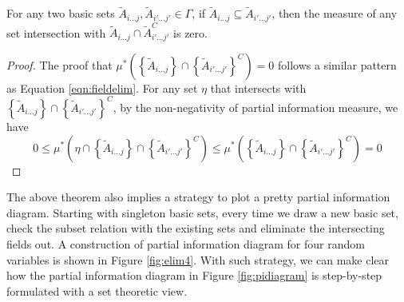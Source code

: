 \begin{theorem} For any two basic sets $\tilde{A}_{i\ldots j} , \tilde{A}_{i' \ldots j'} \in \Gamma$, if $\tilde{A}_{i\ldots j} \subseteq \tilde{A}_{i' \ldots j'}$, then the measure of any set intersection with $\tilde{A}_{i\ldots j} \cap \tilde{A}_{i' \ldots j'}^{C}$ is zero.
\begin{proof}
 The proof that $\mu^{*}\left( \left\{ \tilde{A}_{i\ldots j} \right\} \cap \left\{\tilde{A}_{i'\ldots j'} \right\}^{C} \right) = 0$ follows a similar pattern as Equation \ref{eqn:fieldelim}. For any set $\eta$ that intersects with $ \left\{ \tilde{A}_{i\ldots j} \right\} \cap \left\{\tilde{A}_{i'\ldots j'} \right\}^{C}$, by the non-negativity of partial information measure, we have
  \begin{equation}
     0 \le \mu^{*}\left(\eta  \cap \left\{ \tilde{A}_{i\ldots j} \right\} \cap \left\{\tilde{A}_{i'\ldots j'} \right\}^{C} \right) \le \mu^{*}\left( \left\{ \tilde{A}_{i\ldots j} \right\} \cap \left\{\tilde{A}_{i'\ldots j'} \right\}^{C} \right) = 0
\end{equation}
\end{proof}
\end{theorem}

The above theorem also implies a strategy to plot a pretty partial information diagram. Starting with singleton basic sets, every time we draw a new basic set, check the subset relation with the existing sets and eliminate the intersecting fields out. A construction of partial information diagram for four random variables is shown in Figure \ref{fig:elim4}. With such strategy, we can make clear how the partial information diagram in Figure \ref{fig:pidiagram} is step-by-step formulated with a set theoretic view.


